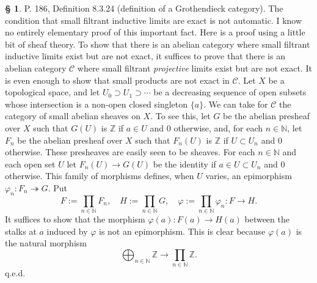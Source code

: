 \documentclass[12pt]{article}
\theoremstyle{remark}
\theoremstyle{definition}
\newtheorem{s}[thm]{\S}
\newcommand{\C}{\mathcal C}
\newcommand{\epi}{\twoheadrightarrow}
\begin{document}
%
%
\begin{s} 
P. 186, Definition 8.3.24 (definition of a Grothendieck category). The condition that small filtrant inductive limits are exact is not automatic. I know no entirely elementary proof of this important fact. Here is a proof using a little bit of sheaf theory. To show that there is an abelian category where small filtrant inductive limits exist but are not exact, it suffices to prove that there is an abelian category $\C$ where small filtrant {\em projective} limits exist but are not exact. It is even enough to show that small products are not exact in $\C$. Let $X$ be a topological space, and let $U_0\supset U_1\supset\cdots$ be a decreasing sequence of open subsets whose intersection is a non-open closed singleton $\{a\}$. We can take for $\C$ the category of small abelian sheaves on $X$. To see this, let $G$ be the abelian presheaf over $X$ such that $G(U)$ is $\mathbb Z$ if $a\in U$ and 0 otherwise, and, for each $n\in\mathbb N$, let $F_n$ be the abelian presheaf over $X$ such that $F_n(U)$ is $\mathbb Z$ if $U\subset U_n$ and 0 otherwise. These presheaves are easily seen to be sheaves. For each $n\in\mathbb N$ and each open set $U$ let $F_n(U)\to G(U)$ be the identity if $a\in U\subset U_n$ and 0 otherwise. This family of morphisms defines, when $U$ varies, an epimorphism $\varphi_n:F_n\epi G$. Put 
$$
F:=\prod_{n\in\mathbb N}F_n,\quad H:=\prod_{n\in\mathbb N}G,\quad\varphi:=\prod_{n\in\mathbb N}\varphi_n:F\to H.
$$ 
It suffices to show that the morphism $\varphi(a):F(a)\to H(a)$ between the stalks at $a$ induced by $\varphi$ is not an epimorphism. This is clear because $\varphi(a)$ is the natural morphism 
$$
\bigoplus_{n\in\mathbb N}\mathbb Z\to\prod_{n\in\mathbb N}\mathbb Z.
$$
q.e.d.
\end{s}
%
%
\end{document}
